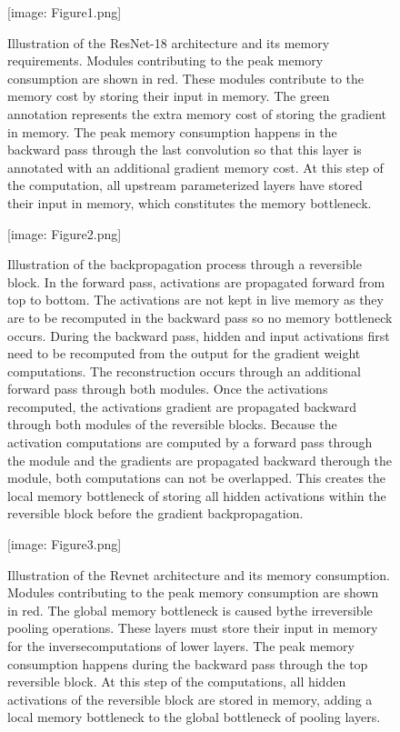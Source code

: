 \documentclass[twocolumn]{bmcart}
\def\texttt{[image: ]}
\begin{document}
\begin{backmatter}
\begin{figure}[t]
\texttt{[image: Figure1.png]}
\caption{
Illustration of the ResNet-18 architecture and its memory requirements.
Modules contributing to the peak memory consumption are shown in red.
These modules contribute to the memory cost by storing their input in memory.
The green annotation represents the extra memory cost of storing the gradient in memory.
The peak memory consumption happens in the backward pass through the last convolution so that this layer is annotated with an additional gradient memory cost.
At this step of the computation, all upstream parameterized layers have stored their input in memory, which constitutes the memory bottleneck.  
}
\end{figure}

\begin{figure}[t]
\texttt{[image: Figure2.png]}
\caption{
Illustration of the backpropagation process through a reversible block.
In the forward pass, activations are propagated forward from top to bottom.
The activations are not kept in live memory as they are to be recomputed in the backward pass so no memory bottleneck occurs.
During the backward pass, hidden and input activations first need to be recomputed from the output for the gradient weight computations.
The reconstruction occurs through an additional forward pass through both modules. 
Once the activations recomputed, the activations gradient are propagated backward through both modules of the reversible blocks.
Because the activation computations are computed by a forward pass through the module and the gradients are propagated backward therough the module,
both computations can not be overlapped.
This creates the local memory bottleneck of storing all hidden activations within the reversible block before the gradient backpropagation.
}
\end{figure}

\begin{figure}[t]
\texttt{[image: Figure3.png]}
\caption{
Illustration of the Revnet architecture and its memory consumption.
Modules contributing to the peak memory consumption are shown in red.
The global memory bottleneck is caused bythe irreversible pooling operations.
These layers must store their input in memory for the inversecomputations of lower layers.
The peak memory consumption happens during the backward pass through the top reversible block.
At this step of the computations, all hidden activations of the reversible block are stored in memory,
adding a local memory bottleneck to the global bottleneck of pooling layers.
}
\end{figure}


\end{backmatter}
\end{document}

